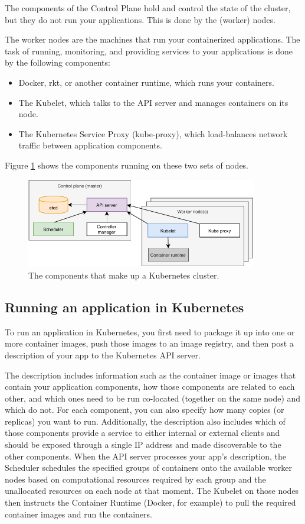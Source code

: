 The components of the Control Plane hold and control the state of the cluster, but they do not run your applications. This is done by the (worker) nodes.

The worker nodes are the machines that run your containerized applications. The task of running, monitoring, and providing services to your applications is done by the following components:
\begin{itemize}
	\item Docker, rkt, or another container runtime, which runs your containers.
	\item The Kubelet, which talks to the API server and manages containers on its node.
	\item The Kubernetes Service Proxy (kube-proxy), which load-balances network traffic
	between application components.
\end{itemize}
Figure \ref{fig:kubecluster} shows the components running on these two sets of nodes.


\begin{figure}[tbp]
	\centering
	\includegraphics[width=0.9\textwidth]{images/kubecluster.pdf}
	\caption{The components that make up a Kubernetes cluster.}
	\label{fig:kubecluster}
\end{figure}



\subsection{Running an application in Kubernetes}
To run an application in Kubernetes, you first need to package it up into one or more container images, push those images to an image registry, and then post a description of your app to the Kubernetes API server.

The description includes information such as the container image or images that contain your application components, how those components are related to each other, and which ones need to be run co-located (together on the same node) and which do not. For each component, you can also specify how many copies (or replicas) you want to run. Additionally, the description also includes which of those components provide a service to either internal or external clients and should be exposed through a single IP address and made discoverable to the other components.
When the API server processes your app's description, the Scheduler schedules the specified groups of containers onto the available worker nodes based on computational resources required by each group and the unallocated resources on each node at that moment. The Kubelet on those nodes then instructs the Container Runtime (Docker, for example) to pull the required container images and run the containers.

